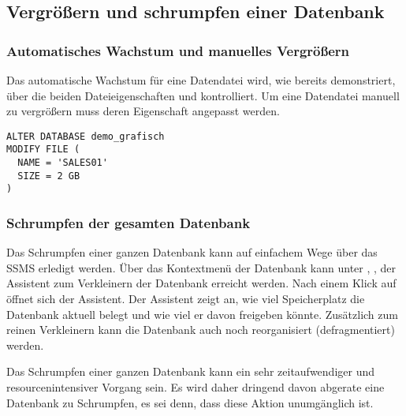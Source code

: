      \subsection{Vergrößern und schrumpfen einer Datenbank}
        \subsubsection{Automatisches Wachstum und manuelles Vergrößern}
          Das automatische Wachstum f\"ur eine Datendatei wird, wie bereits
          demonstriert, über die beiden Dateieigenschaften
           und  kontrolliert. Um eine
          Datendatei manuell zu vergrößern muss deren Eigenschaft
           angepasst werden.
          \begin{lstlisting}[language=ms_sql,caption={Eine
          Datendatei vergrößern},label=admin03_19]
ALTER DATABASE demo_grafisch
MODIFY FILE (
  NAME = 'SALES01'
  SIZE = 2 GB
)
          \end{lstlisting}
        \subsubsection{Schrumpfen der gesamten Datenbank}
          Das Schrumpfen einer ganzen Datenbank kann auf einfachem Wege über das
          SSMS erledigt werden. Über das Kontextmenü der Datenbank kann unter
          , , 
          der Assistent zum Verkleinern der Datenbank erreicht werden.
          Nach einem Klick auf  öffnet sich der Assistent.
          Der Assistent zeigt an, wie viel Speicherplatz die Datenbank aktuell
          belegt und wie viel er davon freigeben könnte. Zusätzlich zum reinen
          Verkleinern kann die Datenbank auch noch reorganisiert
          (defragmentiert) werden.
          \begin{merke}
            Das Schrumpfen einer ganzen Datenbank kann ein sehr zeitaufwendiger
            und resourcenintensiver Vorgang sein. Es wird daher dringend davon
            abgerate eine Datenbank zu Schrumpfen, es sei denn, dass diese
            Aktion unumgänglich ist.
          \end{merke}
